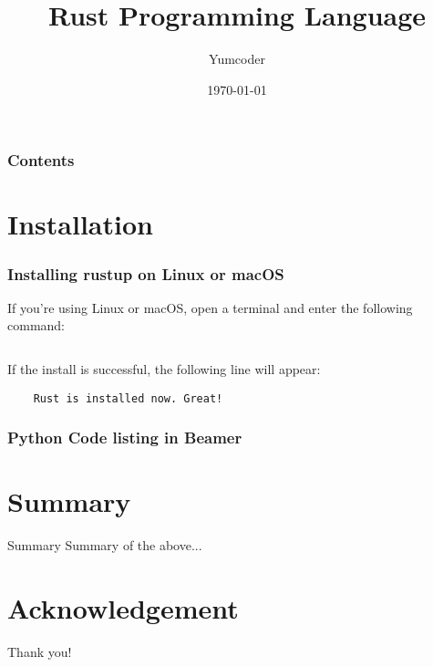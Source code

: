 \documentclass{beamer}
\title[Rust-Lang]{Rust Programming Language}
\author[Yumcoder]{Yumcoder}
\institute[UoT]{University of Toronto}
\date[{\today} ]
{\today}
\begin{document}
\frame{\titlepage}
\begin{frame}
\frametitle{Contents}
\tableofcontents
\end{frame}
\section{Installation}
\begin{frame}[fragile]
\frametitle{Installing rustup on Linux or macOS}
If you’re using Linux or macOS, open a terminal and enter the following command:
\scriptsize
\inputminted{shell}{./code/install.shell}
If the install is successful, the following line will appear:
\begin{verbatim}
	Rust is installed now. Great!
\end{verbatim}
\end{frame}

\begin{frame}[fragile]
\frametitle{Python Code listing in Beamer}
\end{frame}

\section{Summary}

\begin{frame}{Summary}
Summary of the above...
\end{frame}

\section*{Acknowledgement}  
\begin{frame}
\Huge{\centerline{Thank you!}}
\end{frame}
\end{document}
